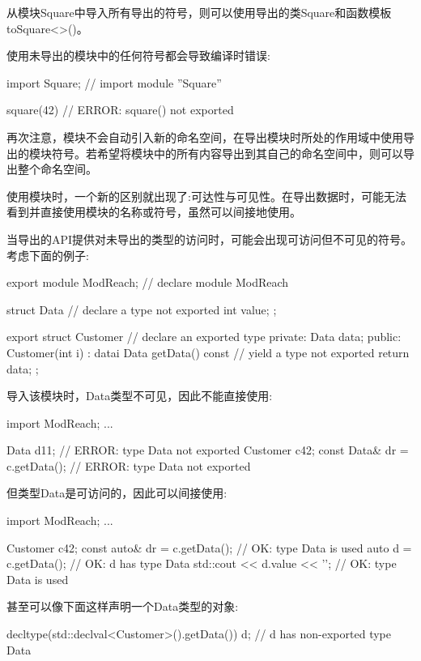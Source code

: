 从模块Square中导入所有导出的符号，则可以使用导出的类Square和函数模板toSquare<>()。

使用未导出的模块中的任何符号都会导致编译时错误:

\begin{cpp}
import Square; // import module ”Square”

square(42) // ERROR: square() not exported
\end{cpp}

再次注意，模块不会自动引入新的命名空间，在导出模块时所处的作用域中使用导出的模块符号。若希望将模块中的所有内容导出到其自己的命名空间中，则可以导出整个命名空间。


使用模块时，一个新的区别就出现了:可达性与可见性。在导出数据时，可能无法看到并直接使用模块的名称或符号，虽然可以间接地使用。

当导出的API提供对未导出的类型的访问时，可能会出现可访问但不可见的符号。考虑下面的例子:

\begin{cpp}
export module ModReach; // declare module ModReach

struct Data { // declare a type not exported
	int value;
};

export struct Customer { // declare an exported type
private:
	Data data;
public:
	Customer(int i)
	: data{i} {
	}
	Data getData() const { // yield a type not exported
		return data;
	}
};
\end{cpp}

导入该模块时，Data类型不可见，因此不能直接使用:

\begin{cpp}
import ModReach;
...

Data d{11}; // ERROR: type Data not exported
Customer c{42};
const Data& dr = c.getData(); // ERROR: type Data not exported
\end{cpp}

但类型Data是可访问的，因此可以间接使用:

\begin{cpp}
import ModReach;
...

Customer c{42};
const auto& dr = c.getData(); // OK: type Data is used
auto d = c.getData(); // OK: d has type Data
std::cout << d.value << '\n'; // OK: type Data is used
\end{cpp}

甚至可以像下面这样声明一个Data类型的对象:

\begin{cpp}
decltype(std::declval<Customer>().getData()) d; // d has non-exported type Data
\end{cpp}


